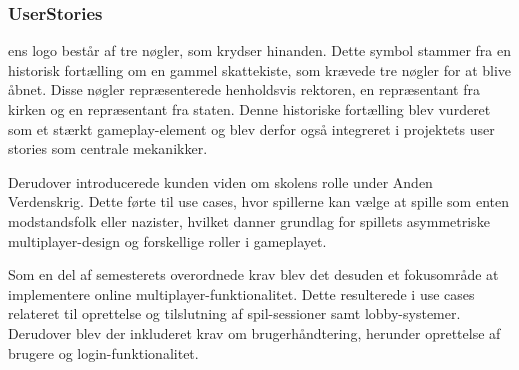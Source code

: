 \subsubsection{UserStories}
ens logo består af tre nøgler, som krydser hinanden. Dette symbol stammer fra en historisk fortælling om en gammel skattekiste, som krævede tre nøgler for at blive åbnet. Disse nøgler repræsenterede henholdsvis rektoren, en repræsentant fra kirken og en repræsentant fra staten. Denne historiske fortælling blev vurderet som et stærkt gameplay-element og blev derfor også integreret i projektets user stories som centrale mekanikker.

Derudover introducerede kunden viden om skolens rolle under Anden Verdenskrig. Dette førte til use cases, hvor spillerne kan vælge at spille som enten modstandsfolk eller nazister, hvilket danner grundlag for spillets asymmetriske multiplayer-design og forskellige roller i gameplayet.

Som en del af semesterets overordnede krav blev det desuden et fokusområde at implementere online multiplayer-funktionalitet. Dette resulterede i use cases relateret til oprettelse og tilslutning af spil-sessioner samt lobby-systemer. Derudover blev der inkluderet krav om brugerhåndtering, herunder oprettelse af brugere og login-funktionalitet.

